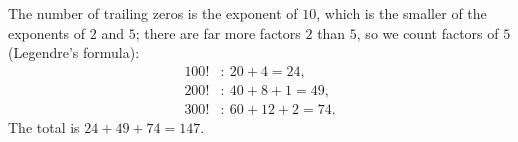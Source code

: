 The number of trailing zeros is the exponent of $10$, which is the smaller of the exponents of $2$ and $5$; there are far more factors $2$ than $5$, so we count factors of $5$ (Legendre's formula):
\[
\begin{aligned}
100!&:\ 20+4=24,\\
200!&:\ 40+8+1=49,\\
300!&:\ 60+12+2=74.
\end{aligned}
\]
The total is $24+49+74=\boxed{147}$.
